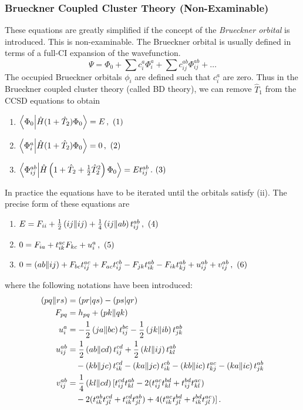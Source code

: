 \documentclass{article}
\theoremstyle{plain}\theoremheaderfont{\normalfont\itshape}\theorembodyfont{\rmfamily}\theoremseparator{.}\newtheorem*{rem}{Remark}\newtheorem*{ex}{Example}\newtheorem*{proof}{Proof}\newtheorem*{altp}{Alternative proof}
\theoremstyle{plain}\theoremheaderfont{\normalfont\bfseries}\theorembodyfont{\rmfamily}\theoremseparator{.}\newtheorem{thm}{Theorem}[section]\newtheorem{lem}[thm]{Lemma}\newtheorem{prop}[thm]{Proposition}\newtheorem*{cor}{Corollary}\newtheorem{defn}[thm]{Definition}\newtheorem{clm}[thm]{Claim}\newtheorem{clminproof}{Claim}
\theoremstyle{break}\theoremheaderfont{\normalfont\itshape}\theorembodyfont{\rmfamily}\theoremseparator{.\medskip}\newtheorem*{proofskip}{Proof}\newtheorem*{exs}{Examples}\newtheorem*{rems}{Remarks}
\theoremstyle{break}\theoremheaderfont{\normalfont\bfseries}\theorembodyfont{\rmfamily}\theoremseparator{.\medskip}\newtheorem{lemskip}[thm]{Lemma}\newtheorem{defnskip}[thm]{Definition}\newtheorem{propskip}[thm]{Proposition}\newtheorem{thmskip}[thm]{Theorem}
\numberwithin{equation}{section}
\newcommand{\braket}[2]{\left\langle #1 \middle| #2 \right\rangle}
\newcommand{\bracket}[2]{\left( #1 \middle| #2 \right)}
\newcommand{\braccket}[2]{\left( #1 \middle\| #2 \right)}
\newcommand{\inlineeqno}{\hfill\stepcounter{equation}\ (\theequation)}
\begin{document}
    \subsubsection{Brueckner Coupled Cluster Theory (Non-Examinable)}

    These equations are greatly simplified if the concept of the \textit{Brueckner orbital} is introduced. This is non-examinable. The Brueckner orbital is usually defined in terms of a full-CI expansion of the wavefunction.
    \begin{equation}
        \Psi=\Phi_0+\sum c_i^a\Phi_i^a+\sum c_{ij}^{ab}\Phi_{ij}^{ab}+\dots
    \end{equation}
    The occupied Brueckner orbitals \(\phi_i\) are defined such that \(c_i^a\) are zero. Thus in the Brueckner coupled cluster theory (called BD theory), we can remove \(\hat{T}_1\) from the CCSD equations to obtain
    \begin{enumerate}[topsep=0pt,label=(\roman*)]
        \item \hfill \(\braket{\Phi_0}{\hat{H}(1+\hat{T}_2)\Phi_0}=E\,,\inlineeqno\)
        \item \hfill \(\braket{\Phi_{i}^{a}}{\hat{H}(1+\hat{T}_2)\Phi_0}=0\,,\inlineeqno\)
        \item \hfill \(\braket{\Phi_{ij}^{ab}}{\hat{H}\left(1+\hat{T}_2+\frac{1}{2}\hat{T}_2^2\right)\Phi_0}=Et_{ij}^{ab}\,.\inlineeqno\)
    \end{enumerate}
    In practice the equations have to be iterated until the orbitals satisfy (ii). The precise form of these equations are
    \begin{enumerate}[topsep=0pt,label=(\roman*)]
        \item \hfill \(E=F_{ii}+\frac{1}{2}\braccket{ij}{ij}+\frac{1}{4}\braccket{ij}{ab}t_{ij}^{ab}\,,\inlineeqno\)
        \item \hfill \(0=F_{ia}+t_{ik}^{ac}F_{kc}+u_i^a\,,\inlineeqno\)
        \item \hfill \(0=\braccket{ab}{ij}+F_{bc}t_{ij}^{ac}+F_{ac}t_{ij}^{cb}-F_{jk}t_{ik}^{ab}-F_{ik}t_{kj}^{ab}+u_{ij}^{ab}+v_{ij}^{ab}\,,\inlineeqno\)
    \end{enumerate}
    where the following notations have been introduced:
    \begin{align}
        \braccket{pq}{rs}&=\bracket{pr}{qs}-\bracket{ps}{qr}\\
        F_{pq}&=h_{pq}+\braccket{pk}{qk}\\
        u_{i}^{a}&=-\frac{1}{2}\braccket{ja}{bc}t_{ij}^{bc}-\frac{1}{2}\braccket{jk}{ib}t_{jk}^{ab}\\
        u_{ij}^{ab}&=\frac{1}{2}\braccket{ab}{cd}t_{ij}^{cd}+\frac{1}{2}\braccket{kl}{ij}t_{kl}^{ab} \notag \\
        &\quad -\braccket{kb}{jc}t_{ik}^{cd}-\braccket{ka}{jc}t_{ik}^{cb}-\braccket{kb}{ic}t_{kj}^{ac}-\braccket{ka}{ic}t_{jk}^{ab}\\
        v_{ij}^{ab}&=\frac{1}{4}\braccket{kl}{cd}[t_{ij}^{cd}t_{kl}^{ab}-2(t_{ij}^{ac}t_{kl}^{bd}+t_{ij}^{bd}t_{kl}^{ac}) \notag \\
        &\quad-2(t_{ik}^{ab}t_{jl}^{cd}+t_{ik}^{cd}t_{jl}^{ab})+4(t_{ik}^{ac}t_{jl}^{bd}+t_{ik}^{bd}t_{jl}^{ac})]\,.
    \end{align}
\end{document}
